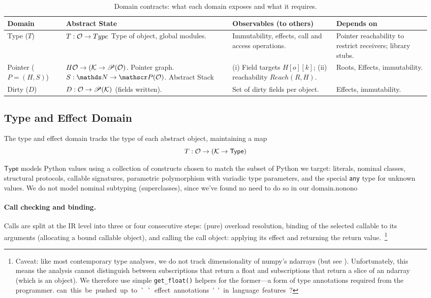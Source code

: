 \begin{table}[t]
\centering
\small
\begin{tabular}{p{15mm}p{36mm}p{37mm}p{40mm}}
\toprule
\textbf{Domain} & \textbf{Abstract State} & \textbf{Observables (to others)} & \textbf{Depends on} \\
\midrule
Type ($T$) &
  $T:\mathcal{O}\to \mathcal \mathsf{Type}$
  Type of object, global modules. &
  Immutability, effects, call and access operations. &
  Pointer reachability to restrict receivers; library stubs. \\
\addlinespace
Pointer ($P=(H,S)$) &
  $H \mathcal{O} \to(\mathcal{K} \to \mathscr{P}(\mathcal{O})$.
  Pointer graph. 
  $S:\tN \to \powerset(\tO)$. Abstract Stack
  &
  (i) Field targets $H[o][k]$; (ii) reachability $Reach(R,H)$. &
  Roots, Effects, immutability. \\
\addlinespace
Dirty ($D$) &
  $D:\mathcal{O}\to \mathcal {\mathscr{P}}(\mathcal{K})$ (fields written). &
  Set of dirty fields per object. &
  Effects,  immutability. \\
\bottomrule
\end{tabular}
\caption{Domain contracts: what each domain exposes and what it requires.}
\label{tab:contracts}
\end{table}

\subsection{Type and Effect Domain}
The type and effect domain tracks the type of each abstract object, maintaining a map \[T : \mathcal{O} \to (\mathcal{K} \to \mathsf{Type})\] 

$\mathsf{Type}$ models Python values using a collection of constructs chosen to match the subset of Python we target: literals, nominal classes, structural protocols, callable signatures, parametric polymorphism with variadic type parameters, and the special \texttt{any} type for unknown values. We do not model nominal subtyping (superclasses), since we've found no need to do so in our domain.\si{nonono}

\paragraph{Call checking and binding.}
Calls are split at the IR level into three or four consecutive steps: (pure) overload resolution, binding of the selected callable to its arguments (allocating a bound callable object), and calling the call object: applying its effect and returning the return value.~\footnote{Caveat: like most contemporary type analyses, we do not track dimensionality of numpy's \textsf{ndarrays} (but see \cite{liu2020type}). Unfortunately, this means the analysis cannot distinguish between subscriptions that return a \textsf{float} and subscriptions that return a slice of an \textsf{ndarray} (which is an object). We therefore use simple \texttt{get\_float()} helpers for the former---a form of type annotations required from the programmer.
\si{can this be pushed up to ``effect annotations'' in language features?}}


